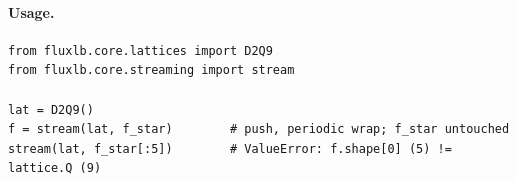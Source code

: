 \paragraph{Usage.}
\begin{lstlisting}[style=py]
from fluxlb.core.lattices import D2Q9
from fluxlb.core.streaming import stream

lat = D2Q9()
f = stream(lat, f_star)        # push, periodic wrap; f_star untouched
stream(lat, f_star[:5])        # ValueError: f.shape[0] (5) != lattice.Q (9)
\end{lstlisting}
